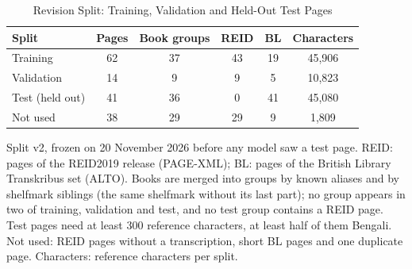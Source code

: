 \begin{table}[t]
\centering
\caption{Revision Split: Training, Validation and Held-Out Test Pages}
\label{tab:testsplit}
\setlength{\tabcolsep}{4pt}
\footnotesize
\begin{tabular}{lccccc}
\toprule
Split & Pages & Book groups & REID & BL & Characters \\
\midrule
Training & 62 & 37 & 43 & 19 & 45{,}906 \\
Validation & 14 & 9 & 9 & 5 & 10{,}823 \\
Test (held out) & 41 & 36 & 0 & 41 & 45{,}080 \\
Not used & 38 & 29 & 29 & 9 & 1{,}809 \\
\bottomrule
\end{tabular}
\par\smallskip
\begin{minipage}{\linewidth}\footnotesize Split v2, frozen on 20 November 2026 before any model saw a test page. REID: pages of the REID2019 release (PAGE-XML); BL: pages of the British Library Transkribus set (ALTO). Books are merged into groups by known aliases and by shelfmark siblings (the same shelfmark without its last part); no group appears in two of training, validation and test, and no test group contains a REID page. Test pages need at least 300 reference characters, at least half of them Bengali. Not used: REID pages without a transcription, short BL pages and one duplicate page. Characters: reference characters per split.\end{minipage}
\end{table}
